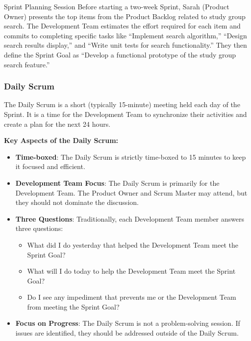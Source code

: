 \begin{examplecard}{Sprint Planning Session}
  Before starting a two-week Sprint, Sarah (Product Owner) presents the top items from the Product Backlog related to study group search. The Development Team estimates the effort required for each item and commits to completing specific tasks like ``Implement search algorithm,'' ``Design search results display,'' and ``Write unit tests for search functionality.'' They then define the Sprint Goal as ``Develop a functional prototype of the study group search feature.''
\end{examplecard}

\subsubsection{Daily Scrum}

The Daily Scrum is a short (typically 15-minute) meeting held each day of the
Sprint. It is a time for the Development Team to synchronize their activities
and create a plan for the next 24 hours.

\textbf{Key Aspects of the Daily Scrum:}

\begin{itemize}
  \item \textbf{Time-boxed}: The Daily Scrum is strictly time-boxed to 15 minutes to keep it focused and efficient.
  \item \textbf{Development Team Focus}: The Daily Scrum is primarily for the Development Team. The Product Owner and Scrum Master may attend, but they should not dominate the discussion.
  \item \textbf{Three Questions}: Traditionally, each Development Team member answers three questions:
        \begin{itemize}
          \item What did I do yesterday that helped the Development Team meet the Sprint Goal?
          \item What will I do today to help the Development Team meet the Sprint Goal?
          \item Do I see any impediment that prevents me or the Development Team from meeting
                the Sprint Goal?
        \end{itemize}
  \item \textbf{Focus on Progress}: The Daily Scrum is not a problem-solving session. If issues are identified, they should be addressed outside of the Daily Scrum.
\end{itemize}


